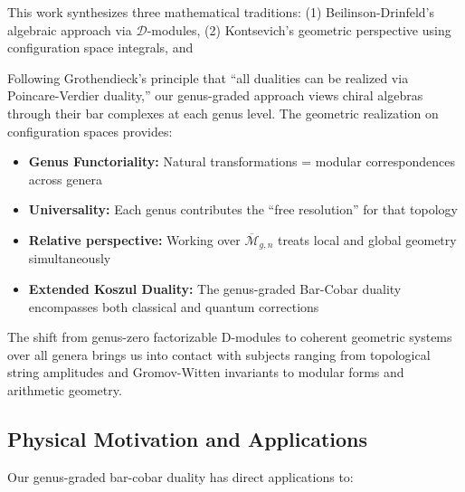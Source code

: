 This work synthesizes three mathematical traditions: (1) Beilinson-Drinfeld's algebraic approach via 
$\mathcal{D}$-modules, (2) Kontsevich's geometric perspective using configuration space integrals, and 

\begin{remark}
Following Grothendieck's principle that ``all dualities can be realized via Poincare-Verdier duality,'' our genus-graded approach views chiral algebras through their bar complexes at each genus level. The geometric realization on configuration spaces provides:
\begin{itemize}
\item \textbf{Genus Functoriality:} Natural transformations = modular correspondences across genera
\item \textbf{Universality:} Each genus contributes the ``free resolution'' for that topology
\item \textbf{Relative perspective:} Working over $\overline{\mathcal{M}}_{g,n}$ treats local and global geometry simultaneously
\item \textbf{Extended Koszul Duality:} The genus-graded Bar-Cobar duality encompasses both classical and quantum corrections
\end{itemize}
The shift from genus-zero factorizable D-modules to coherent geometric systems over all genera brings us into contact with subjects ranging from topological string amplitudes and Gromov-Witten invariants to modular forms and arithmetic geometry.
\end{remark}

\subsection{Physical Motivation and Applications}

Our genus-graded bar-cobar duality has direct applications to:

